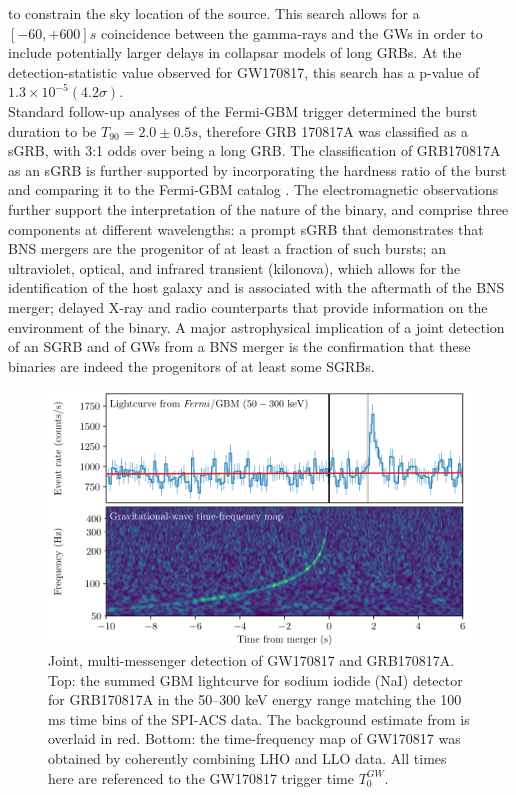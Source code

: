 \documentclass[binding=0.6cm, LaM]{sapthesis}
\begin{document}
	to constrain the sky location of the source. This search allows for a $[-60, +600] s$ 
	coincidence between the gamma-rays and the GWs in order to include potentially 
	larger delays in collapsar models of long GRBs. 
	At the detection-statistic value observed for GW170817, this search has a p-value of $1.3\times 10^{-5} (4.2\sigma)$. \\ 
	Standard follow-up analyses \cite{108,110} of the Fermi-GBM trigger 
	determined the burst duration to be $T_{90} = 2.0 \pm 0.5 s$,
	therefore GRB 170817A was classified as a sGRB, with 3:1 odds over being a long GRB. 
	The classification of GRB170817A as an sGRB is further supported by incorporating 
	the hardness ratio of the burst and comparing it to the Fermi-GBM catalog \cite{110}. 
	The electromagnetic observations further support the interpretation of the nature of the binary, 
	and comprise three components at different wavelengths: a prompt sGRB that demonstrates 
	that BNS mergers are the progenitor of at least a fraction of such bursts; an ultraviolet, optical, 
	and infrared transient (kilonova), which allows for the identification of the host galaxy 
	and is associated with the aftermath of the BNS merger; 
	delayed X-ray and radio counterparts that provide information on the environment of the binary. 
	A major astrophysical implication of a joint detection of an SGRB and of GWs from a BNS merger 
	is the confirmation that these binaries are indeed the progenitors of at least some SGRBs. 
		\begin{figure}[H]
                        \label{gw-grb}
                        \includegraphics[scale=0.45]{gw-grb}
                        \centering
                        \caption{Joint, multi-messenger detection of GW170817 and GRB170817A. Top: the summed GBM lightcurve for sodium iodide (NaI) detector for GRB170817A in the 50–300 keV energy range matching the 100 ms time bins of the SPI-ACS data. The background estimate from \cite{110} is overlaid in red. Bottom: the time-frequency map of GW170817 was obtained by coherently combining LHO and LLO data. All times here are referenced to the GW170817 trigger time $T_0^{GW}$. \cite{55}}
                        \label{fig:gw-grb}
                \end{figure}
\end{document}
